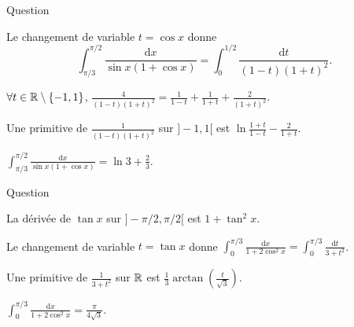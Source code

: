 \begin{multi}{Question}
    \item* Le changement de variable \(t=\cos x\) donne
\[\displaystyle \int _{\pi/3}^{\pi/2}\frac{\mathrm{d}x}{\sin x(1+\cos x)}=\int _0^{1/2}\frac{\mathrm{d}t}{(1-t)(1+t)^2}.\]
    \item* \(\forall t\in \mathbb{R}\setminus \{-1,1\}\), \(\displaystyle \frac{4}{(1-t)(1+t)^2}=\frac{1}{1-t}+\frac{1}{1+t}+\frac{2}{(1+t)^2}\).
    \item Une primitive de \(\displaystyle \frac{1}{(1-t)(1+t)^2}\) sur \(]-1,1[\) est \(\displaystyle \ln \frac{1+t}{1-t}-\frac{2}{1+t}\).
    \item \(\displaystyle \int _{\pi/3}^{\pi/2}\frac{\mathrm{d}x}{\sin x(1+\cos x)}=\ln 3+\frac{2}{3}\).
\end{multi}


\begin{multi}{Question}
    \item* La dérivée de \(\tan x\) sur \(\displaystyle ]-\pi/2,\pi/2[\) est \(1+\tan ^2x\).
    \item Le changement de variable \(t=\tan x\) donne \(\displaystyle \int _0^{\pi/3}\frac{\mathrm{d}x}{1+2\cos ^2x}=\int _0^{\pi/3}\frac{\mathrm{d}t}{3+t^2}\).
    \item Une primitive de \(\displaystyle \frac{1}{3+t^2}\) sur \(\mathbb{R}\) est \(\displaystyle \frac{1}{3}\arctan \left(\frac{t}{\sqrt{3}}\right)\).
    \item* \(\displaystyle \int _0^{\pi/3}\frac{\mathrm{d}x}{1+2\cos ^2x}=\frac{\pi}{4\sqrt{3}}\).
\end{multi}


